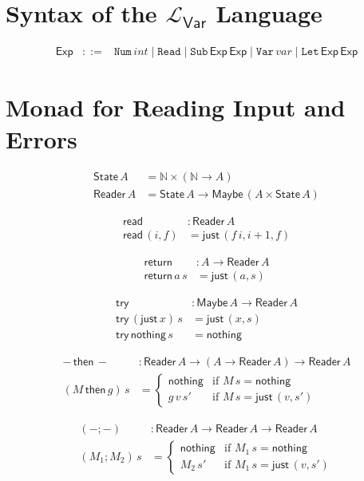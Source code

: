 \documentclass{paper}
\newcommand{\itm}[1]{\ensuremath{\mathit{#1}}}
\newcommand{\key}[1]{\texttt{#1}}
\newcommand{\Lang}{\mathcal{L}}
\newcommand{\LangVar}{$\Lang_{\mathsf{Var}}$} %
\newcommand{\Exp}{\mathsf{Exp}}
\newcommand{\app}{\,}
\newcommand{\Int}{\itm{int}}
\newcommand{\Var}{\itm{var}}
\newcommand{\VAR}[1]{\key{Var}\app #1}
\newcommand{\NUM}[1]{\key{Num}\app #1}
\newcommand{\SUB}[2]{\key{Sub}\app #1 \app #2}
\newcommand{\LET}[2]{\key{Let}\app#1\app#2}
\newcommand{\READ}{\key{Read}}
\newcommand{\DOREAD}{\mathsf{read}}
\newcommand{\STATE}[1]{\mathsf{State}\app #1}
\newcommand{\READER}[1]{\mathsf{Reader}\app #1}
\newcommand{\MAYBE}[1]{\mathsf{Maybe}\app #1}
\newcommand{\JUST}[1]{\mathsf{just}\app #1}
\newcommand{\NOTHING}{\mathsf{nothing}}
\newcommand{\TRY}{\mathsf{try}}
\newcommand{\THEN}{\,\mathsf{then}\,}
\begin{document}
  

\section{Syntax of the \LangVar{} Language}

\[
\begin{array}{rcl}
  \Exp & ::= & \NUM{\Int} \mid \READ{} \mid \SUB{\Exp}{\Exp}
    \mid \VAR{\Var} \mid \LET{\Exp}{\Exp}
\end{array}
\]

\section{Monad for Reading Input and Errors}

\begin{align*}
\STATE{A} &= \mathbb{N} \times (\mathbb{N} \to A) \\
\READER{A} &= \STATE{A} \to \MAYBE{(A \times \STATE{A})}
\end{align*}

\begin{align*}
  \DOREAD & : \READER{A} \\
\DOREAD \app (i , f) &= \JUST{(f\app i , i + 1 , f)}
\end{align*}

\begin{align*}
  \mathsf{return} & : A \to \READER{A} \\
\mathsf{return}\app a \app s &= \JUST{(a , s)}
\end{align*}

\begin{align*}
  \TRY & : \MAYBE{A} \to \READER{A} \\
\TRY\app  (\JUST{x})\app  s &= \JUST{(x , s)} \\
\TRY\app  \NOTHING{}\app  s &= \NOTHING{}
\end{align*}

\begin{align*}
 - \THEN - & : \READER{A} \to (A \to \READER{A}) \to \READER{A} \\
(M \THEN g) \app s & =
\begin{cases}
\NOTHING{} & \text{if } M\app s = \NOTHING{} \\
g\app  v\app  s' & \text{if } M\app s = \JUST{(v,s')}
\end{cases}
\end{align*}

\begin{align*}
  (- ; -) & : \READER{A} \to \READER{A} \to \READER{A} \\
(M_1 ;  M_2) \app s &=
\begin{cases}
\NOTHING{} & \text{if } M_1\app  s = \NOTHING{} \\
M_2\app  s' & \text{if } M_1\app s = \JUST{(v , s')}
\end{cases}
\end{align*}
\end{document}
